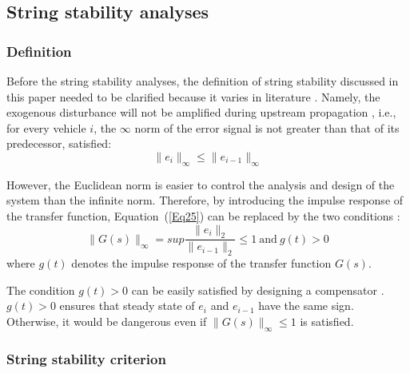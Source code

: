 \documentclass[journal]{IEEEtran}
\begin{document}
\subsection{String stability analyses}
\label{Section 4.3}

\subsubsection{Definition}
\label{Section 4.3.1}

Before the string stability analyses, the definition of string stability discussed in this paper needed to be clarified because it varies in literature \citep{Ruan2021,Wilson2008,Treiber2011}. Namely, the exogenous disturbance will not be amplified during upstream propagation \citep{Jin2014,Montanino2021a,Qin2021}, i.e., for every vehicle $i$, the $\infty$ norm of the error signal is not greater than that of its predecessor, satisfied:
\begin{equation}
  \parallel {e_i}{\parallel _\infty } \leqslant \parallel {e_{i - 1}}{\parallel _\infty }
  \label{Eq25}
\end{equation}

However, the Euclidean norm is easier to control the analysis and design of the system than the infinite norm. Therefore, by introducing the impulse response of the transfer function, Equation~(\ref{Eq25}) can be replaced by the two conditions \citep{Swaroop1994,Darbha1999}:
\begin{equation}
  \parallel G\left(s\right)\parallel_\infty = sup\frac{\parallel e_i\parallel_2}{\parallel e_{i-1}\parallel_2}\le1\mathrm{\ and\ }g(t)>0
  \label{Eq26}
\end{equation}
where $g(t)$ denotes the impulse response of the transfer function $G(s)$.

The condition $g(t)>0$ can be easily satisfied by designing a compensator \citep{Rajamani2011,Darbha2003}. $g(t)>0$ ensures that steady state of $e_i$ and $e_{i-1}$ have the same sign. Otherwise, it would be dangerous even if $\parallel G\left(s\right)\parallel_\infty\le1$ is satisfied.

\subsubsection{String stability criterion}
\label{Section 4.3.2}
\end{document}
